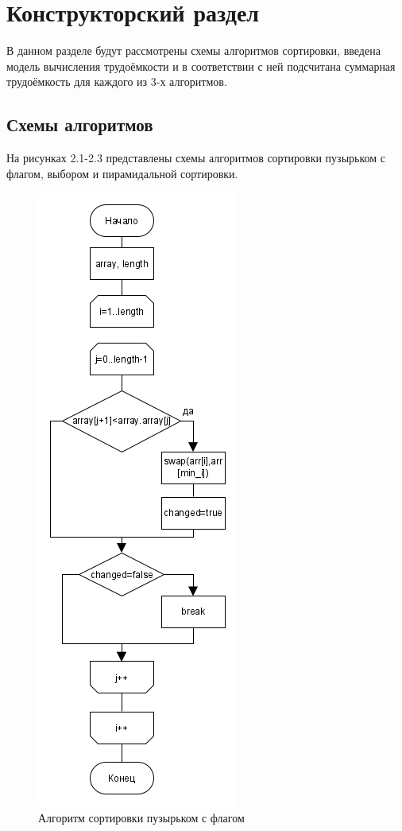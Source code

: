 \chapter{Конструкторский раздел}
\label{cha:design}
В данном разделе будут рассмотрены схемы алгоритмов сортировки, введена модель вычисления трудоёмкости и в соответствии с ней подсчитана суммарная трудоёмкость для каждого из 3-х алгоритмов.
\section{Схемы алгоритмов}
\label{sec:schemes}
На рисунках 2.1-2.3 представлены схемы алгоритмов сортировки пузырьком с флагом, выбором и пирамидальной сортировки.
\begin{figure}[H]
	\centering
	\includegraphics[height=0.8\textheight]{src/bubbleSort}
	\caption{Алгоритм сортировки пузырьком с флагом}
	\label{fig:bubblesort}
\end{figure}

